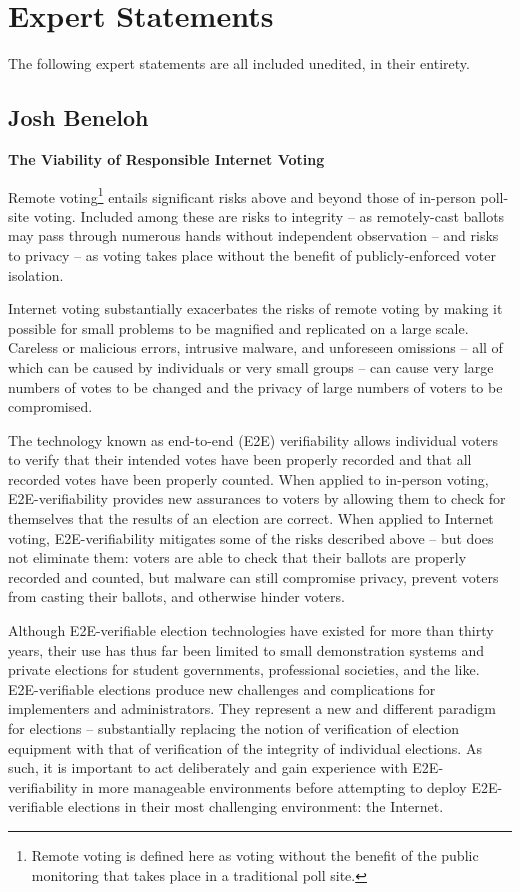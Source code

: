 \chapter{Expert Statements}
\label{appendix:expert_statements}

The following expert statements are all included unedited, in their
entirety.

\section{Josh Beneloh}

\textbf{The Viability of Responsible Internet Voting}

Remote voting\footnote{Remote voting is defined here as voting without
  the benefit of the public monitoring that takes place in a
  traditional poll site.}  entails significant risks above and beyond
those of in-person poll-site voting.  Included among these are risks
to integrity – as remotely-cast ballots may pass through numerous
hands without independent observation – and risks to privacy – as
voting takes place without the benefit of publicly-enforced voter
isolation.

Internet voting substantially exacerbates the risks of remote voting
by making it possible for small problems to be magnified and
replicated on a large scale.  Careless or malicious errors, intrusive
malware, and unforeseen omissions – all of which can be caused by
individuals or very small groups – can cause very large numbers of
votes to be changed and the privacy of large numbers of voters to be
compromised.

The technology known as end-to-end (E2E) verifiability allows
individual voters to verify that their intended votes have been
properly recorded and that all recorded votes have been properly
counted.  When applied to in-person voting, E2E-verifiability provides
new assurances to voters by allowing them to check for themselves that
the results of an election are correct.  When applied to Internet
voting, E2E-verifiability mitigates some of the risks described above
– but does not eliminate them:  voters are able to check that their
ballots are properly recorded and counted, but malware can still
compromise privacy, prevent voters from casting their ballots, and
otherwise hinder voters.

Although E2E-verifiable election technologies have existed for more
than thirty years, their use has thus far been limited to small
demonstration systems and private elections for student governments,
professional societies, and the like.  E2E-verifiable elections
produce new challenges and complications for implementers and
administrators.  They represent a new and different paradigm for
elections – substantially replacing the notion of verification of
election equipment with that of verification of the integrity of
individual elections.  As such, it is important to act deliberately
and gain experience with E2E-verifiability in more manageable
environments before attempting to deploy E2E-verifiable elections in
their most challenging environment:  the Internet.


